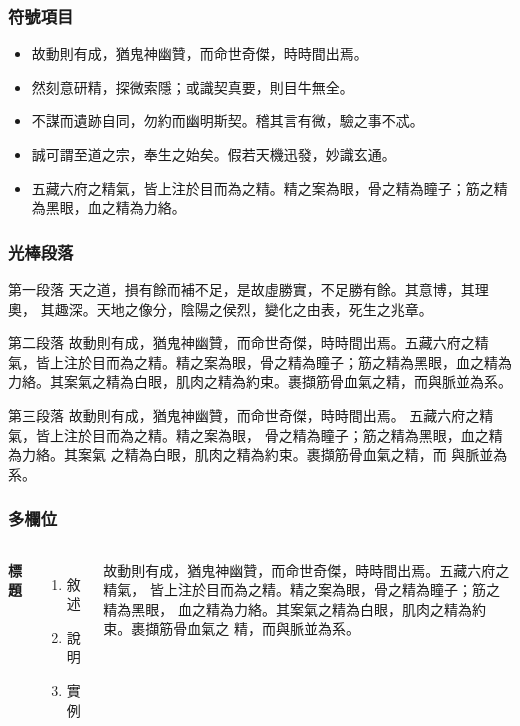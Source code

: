 \documentclass{beamer}
\begin{document}

\begin{frame}
\frametitle{\iyan 符號項目}
\begin{itemize}
\item 故動則有成，猶鬼神幽贊，而命世奇傑，時時間出焉。
\item 然刻意研精，探微索隱；或識契真要，則目牛無全。
\item 不謀而遺跡自同，勿約而幽明斯契。稽其言有微，驗之事不忒。
\item 誠可謂至道之宗，奉生之始矣。假若天機迅發，妙識玄通。
\item 五藏六府之精氣，皆上注於目而為之精。精之案為眼，骨之精為瞳子；筋之精為黑眼，血之精為力絡。
\end{itemize}
\end{frame}


\begin{frame}
\frametitle{\iyan 光棒段落}
\begin{block}{第一段落}
天之道，損有餘而補不足，是故虛勝實，不足勝有餘。其意博，其理奧，
其趣深。天地之像分，陰陽之侯烈，變化之由表，死生之兆章。
\end{block}

\begin{block}{第二段落}
故動則有成，猶鬼神幽贊，而命世奇傑，時時間出焉。五藏六府之精氣，皆上注於目而為之精。精之案為眼，骨之精為瞳子；筋之精為黑眼，血之精為力絡。其案氣之精為白眼，肌肉之精為約束。裹擷筋骨血氣之精，而與脈並為系。
\end{block}

\begin{block}{第三段落}
故動則有成，猶鬼神幽贊，而命世奇傑，時時間出焉。
五藏六府之精氣，皆上注於目而為之精。精之案為眼，
骨之精為瞳子；筋之精為黑眼，血之精為力絡。其案氣
之精為白眼，肌肉之精為約束。裹擷筋骨血氣之精，而
與脈並為系。
\end{block}
\end{frame}


\begin{frame}
\frametitle{\iyan 多欄位}
\begin{columns}[c] %

\textbf{標題}
\begin{enumerate}
\item 敘述
\item 說明
\item 實例
\end{enumerate}

故動則有成，猶鬼神幽贊，而命世奇傑，時時間出焉。五藏六府之精氣，
皆上注於目而為之精。精之案為眼，骨之精為瞳子；筋之精為黑眼，
血之精為力絡。其案氣之精為白眼，肌肉之精為約束。裹擷筋骨血氣之
精，而與脈並為系。

\end{columns}
\end{frame}
\end{document}
